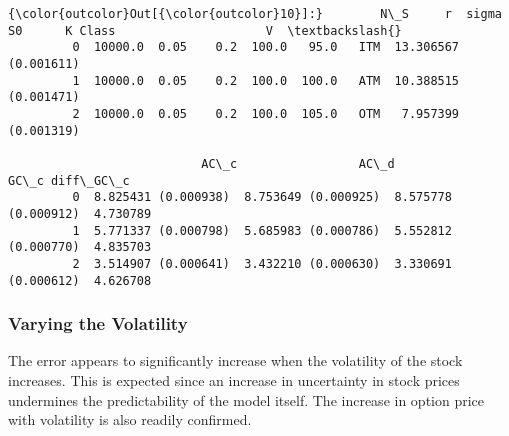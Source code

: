 \documentclass{article}
\begin{document}
            \begin{Verbatim}[commandchars=\\\{\}]
{\color{outcolor}Out[{\color{outcolor}10}]:}        N\_S     r  sigma     S0      K Class                     V  \textbackslash{}
         0  10000.0  0.05    0.2  100.0   95.0   ITM  13.306567 (0.001611)   
         1  10000.0  0.05    0.2  100.0  100.0   ATM  10.388515 (0.001471)   
         2  10000.0  0.05    0.2  100.0  105.0   OTM   7.957399 (0.001319)   
         
                           AC\_c                 AC\_d                 GC\_c diff\_GC\_c  
         0  8.825431 (0.000938)  8.753649 (0.000925)  8.575778 (0.000912)  4.730789  
         1  5.771337 (0.000798)  5.685983 (0.000786)  5.552812 (0.000770)  4.835703  
         2  3.514907 (0.000641)  3.432210 (0.000630)  3.330691 (0.000612)  4.626708  
\end{Verbatim}
        
    \subsubsection{Varying the Volatility}\label{varying-the-volatility}

The error appears to significantly increase when the volatility of the
stock increases. This is expected since an increase in uncertainty in
stock prices undermines the predictability of the model itself. The
increase in option price with volatility is also readily confirmed.
\end{document}
